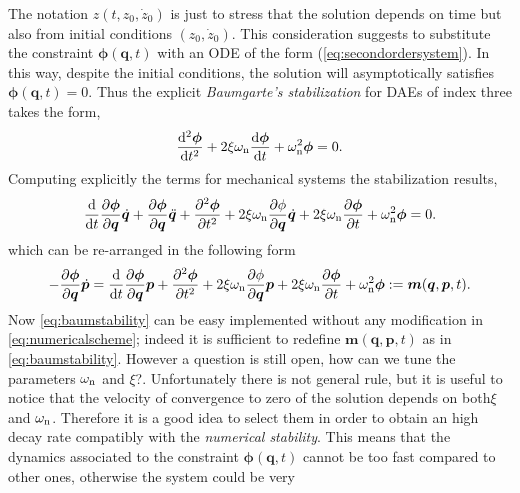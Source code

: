 The notation $z(t,z_{0},\dot{z}_{0})$ is just to stress that the
solution depends on time but also from initial conditions $(z_{0},\dot{z}_{0})$.
This consideration suggests to substitute the constraint
$\bm{\phi}(\bm{q},t)$ with an ODE of the form (\ref{eq:secondordersystem}).
In this way, despite the initial conditions, the solution will asymptotically
satisfies $\bm{\phi}(\bm{q},t)=0$.
Thus the explicit \emph{Baumgarte's stabilization} for DAEs of index three takes the form,	
\begin{equation*}
	\frac{\mathop{}\!\mathrm{d}^2\bm{\phi}}{\mathop{}\!\mathrm{d} t^2} 
	+ 2\xi\omega_{\textnormal{n}}\frac{\mathop{}\!\mathrm{d}\bm{\phi}}{\mathop{}\!\mathrm{d} t}
	+ \omega_{\textnormal{n}}^2\bm{\phi} = 0.
\end{equation*}
Computing explicitly the terms for mechanical systems the stabilization results,
\begin{equation}
	\frac{\mathop{}\!\mathrm{d}}{\mathop{}\!\mathrm{d} t}\frac{\partial\bm{\phi}}
	     {\partial\bm{q}}\dot{\bm{q}}+\frac{\partial\bm{\phi}}
	     {\partial\bm{q}}\ddot{\bm{q}}+\frac{\partial^{2}\bm{\phi}}
	     {\partial t^2} + 2\xi\omega_{\textnormal{n}}
	     \frac{\partial\phi}{\partial\bm{q}}\dot{\bm{q}} 
	+ 2\xi\omega_{\textnormal{n}}\frac{\partial\bm{\phi}}{\partial t}+\omega_{\textnormal{n}}^2\bm{\phi} = 0.
\end{equation}
which can be re-arranged in the following form
\begin{equation}
	\label{eq:baumstability}
	-\frac{\partial\bm{\phi}}{\partial\bm{q}}\dot{\bm{p}}
	= \frac{\mathop{}\!\mathrm{d}}{\mathop{}\!\mathrm{d} t}\frac{\partial\bm{\phi}}{\partial\bm{q}}\bm{p}
	+\frac{\partial^{2}\bm{\phi}}{\partial t^2}
	+ 2\xi\omega_{\textnormal{n}}\frac{\partial\phi}{\partial\bm{q}}\bm{p}
	+ 2\xi\omega_{\textnormal{n}}\frac{\partial\bm{\phi}}{\partial t}
	+\omega_{\textnormal{n}}^2\bm{\phi} :=\bm{m}(\bm{q},\bm{p},t).
\end{equation}
Now \cref{eq:baumstability} can be easy implemented without any modification 
in \cref{eq:numericalscheme}; indeed it is sufficient to redefine $\bm{m}(\bm{q},\bm{p},t)$
as in \cref{eq:baumstability}.
However a question is still open, how can we tune the parameters 
$\omega_{\textnormal{n}}$ and $\xi$?. Unfortunately there is not general rule,
but it is useful to notice that the velocity of convergence to zero of the solution
depends on both$\xi$ and $\omega_{\textnormal{n}}$.
Therefore it is a good idea to select them in order to obtain an high
decay rate compatibly with the \emph{numerical stability}.
This means that the dynamics associated to the constraint $\bm{\phi}(\bm{q},t)$
cannot be too fast compared to other ones, otherwise the system could be very
